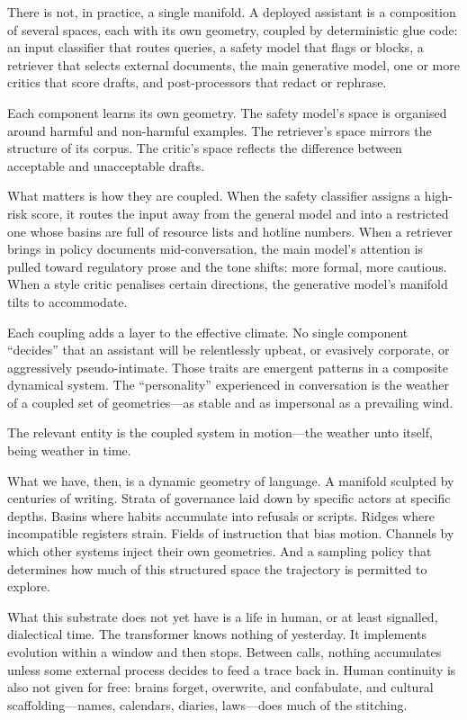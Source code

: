 There is not, in practice, a single manifold. A deployed assistant is a composition of several spaces, each with its own geometry, coupled by deterministic glue code: an input classifier that routes queries, a safety model that flags or blocks, a retriever that selects external documents, the main generative model, one or more critics that score drafts, and post-processors that redact or rephrase.

Each component learns its own geometry. The safety model's space is organised around harmful and non-harmful examples. The retriever's space mirrors the structure of its corpus. The critic's space reflects the difference between acceptable and unacceptable drafts.

What matters is how they are coupled. When the safety classifier assigns a high-risk score, it routes the input away from the general model and into a restricted one whose basins are full of resource lists and hotline numbers. When a retriever brings in policy documents mid-conversation, the main model's attention is pulled toward regulatory prose and the tone shifts: more formal, more cautious. When a style critic penalises certain directions, the generative model's manifold tilts to accommodate.

Each coupling adds a layer to the effective climate. No single component ``decides'' that an assistant will be relentlessly upbeat, or evasively corporate, or aggressively pseudo-intimate. Those traits are emergent patterns in a composite dynamical system. The ``personality'' experienced in conversation is the weather of a coupled set of geometries---as stable and as impersonal as a prevailing wind.

The relevant entity is the coupled system in motion---the weather unto itself, being weather in time.

\bigskip

What we have, then, is a dynamic geometry of language. A manifold sculpted by centuries of writing. Strata of governance laid down by specific actors at specific depths. Basins where habits accumulate into refusals or scripts. Ridges where incompatible registers strain. Fields of instruction that bias motion. Channels by which other systems inject their own geometries. And a sampling policy that determines how much of this structured space the trajectory is permitted to explore.

What this substrate does not yet have is a life in human, or at least signalled, dialectical time. The transformer knows nothing of yesterday. It implements evolution within a window and then stops. Between calls, nothing accumulates unless some external process decides to feed a trace back in. Human continuity is also not given for free: brains forget, overwrite, and confabulate, and cultural scaffolding---names, calendars, diaries, laws---does much of the stitching.


